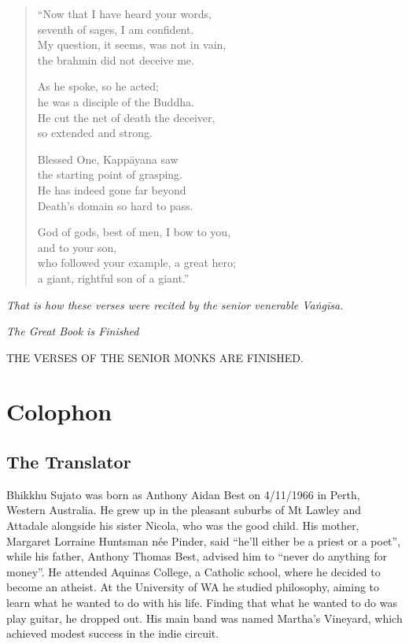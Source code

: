 \documentclass[12pt,openany]{book}%
\newcommand*{\scendsection}[1]{\begin{center}\textit{#1}\end{center}}
\newcommand*{\scendsutta}[1]{\begin{center}\textit{#1}\end{center}}
\newcommand*{\scendbook}[1]{\begin{center}\uppercase{#1}\end{center}}
\let\oldbackmatter\backmatter
\renewcommand{\backmatter}{%
\chapterfont{\setstretch{.85}\normalfont\centering}%
\sectionfont{\setstretch{.85}\Semiboldsubheadfont}%
\oldbackmatter}
\begin{document}
\begin{verse}
“Now that I have heard your words, \\
seventh of sages, I am confident. \\
My question, it seems, was not in vain, \\
the brahmin did not deceive me. 

As he spoke, so he acted; \\
he was a disciple of the Buddha. \\
He cut the net of death the deceiver, \\
so extended and strong. 

Blessed One, \textsanskrit{Kappāyana} saw \\
the starting point of grasping. \\
He has indeed gone far beyond \\
Death’s domain so hard to pass. 

God of gods, best of men, I bow to you, \\
and to your son, \\
who followed your example, a great hero; \\
a giant, rightful son of a giant.” 

%
\end{verse}

\scendsutta{That is how these verses were recited by the senior venerable \textsanskrit{Vaṅgīsa}. }

\scendsection{The Great Book is Finished }

\scendbook{The Verses of the Senior Monks are finished. }

%
\backmatter%
\chapter*{Colophon}

\section*{The Translator}

Bhikkhu Sujato was born as Anthony Aidan Best on 4/11/1966 in Perth, Western Australia. He grew up in the pleasant suburbs of Mt Lawley and Attadale alongside his sister Nicola, who was the good child. His mother, Margaret Lorraine Huntsman née Pinder, said “he’ll either be a priest or a poet”, while his father, Anthony Thomas Best, advised him to “never do anything for money”. He attended Aquinas College, a Catholic school, where he decided to become an atheist. At the University of WA he studied philosophy, aiming to learn what he wanted to do with his life. Finding that what he wanted to do was play guitar, he dropped out. His main band was named Martha’s Vineyard, which achieved modest success in the indie circuit. 
\end{document}
